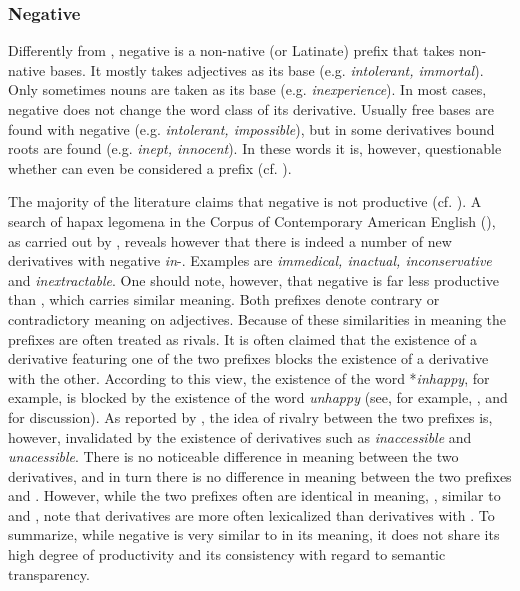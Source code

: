 \subsubsection{Negative  } \label{negative in}

Differently from , negative  is a non-native (or Latinate) prefix that takes non-native bases. It mostly takes adjectives as its base (e.g. \textit{intolerant, immortal}). Only sometimes nouns are taken as its base (e.g. \textit{inexperience}).  In most cases, negative  does not change the word class of its derivative.  Usually free bases are found with negative  (e.g. \textit{intolerant, impossible}), but in some derivatives bound roots are found (e.g. \textit{inept, innocent}). In these words it is, however, questionable whether  can even be considered a prefix (cf. \citealt[356 f, 611]{Bauer.2013}).

The majority of the literature claims that negative  is not productive (cf. \citealt[1688]{Bauer.2002}). A search of hapax legomena in the Corpus of Contemporary American English (\citealt{Davies.20082014}), as carried out by \citet[361] {Bauer.2013}, reveals however that there is indeed a number of new derivatives with negative \textit{in}-. Examples are \textit{immedical, inactual, inconservative} and \textit{inextractable}.  One should note, however, that negative  is far less productive than , which carries similar meaning. Both prefixes denote contrary or contradictory meaning on adjectives.
 Because of these similarities in meaning the prefixes are often treated as rivals. It is often claimed that the existence of a derivative featuring one of the two prefixes blocks the existence of  a derivative with the other. According to this view, the existence of the word *\textit{inhappy}, for example, is blocked by the existence of the word \textit{unhappy} (see, for example,  \citet[467 ff]{Jespersen.1965}, \citet[1688 f]{Bauer.2002} and \citet[377 ff]{Bauer.2013} for discussion).  
As reported by \citet[377]{Bauer.2013}, the idea of rivalry between the two prefixes is, however, invalidated by the existence of derivatives such as \textit{inaccessible} and \textit{unacessible}. There is no noticeable difference in meaning between the two derivatives, and in turn there is no difference in meaning between the two prefixes  and .
However, while the two prefixes often are identical in meaning, \citet[379]{Bauer.2013}, similar to  \cite{Jespersen.1965} and \cite{Bauer.2002},  note that derivatives are more often lexicalized than derivatives with . To summarize, while negative  is very similar to  in its meaning, it does not share its high degree of productivity and its consistency with regard to semantic transparency.

